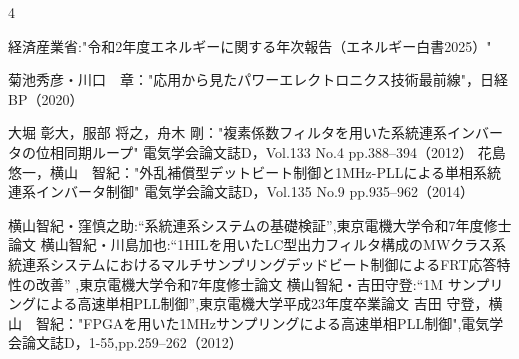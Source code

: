 
\small
\begin{thebibliography}{4} %
 \setlength{\itemsep}{0zh}

   経済産業省:"令和2年度エネルギーに関する年次報告（エネルギー白書2025）"

   菊池秀彦・川口　章："応用から見たパワーエレクトロニクス技術最前線"，日経BP（2020）   

    大堀 彰大，服部 将之，舟木 剛："複素係数フィルタを用いた系統連系インバータの位相同期ループ"
    電気学会論文誌D，Vol.133 No.4 pp.388–394（2012）
    花島　悠一，横山　智紀："外乱補償型デットビート制御と1MHz-PLLによる単相系統連系インバータ制御"
    電気学会論文誌D，Vol.135 No.9 pp.935–962（2014）
   
  
   横山智紀・窪慎之助:“系統連系システムの基礎検証”,東京電機大学令和7年度修士論文
   横山智紀・川島加也:“1HILを用いたLC型出力フィルタ構成のMWクラス系統連系システムにおけるマルチサンプリングデッドビート制御によるFRT応答特性の改善”
   ,東京電機大学令和7年度修士論文
    横山智紀・吉田守登:“1M サンプリングによる高速単相PLL制御”,東京電機大学平成23年度卒業論文
     吉田 守登，横山　智紀："FPGAを用いた1MHzサンプリングによる高速単相PLL制御",電気学会論文誌D，1-55,pp.259–262（2012）
\end{thebibliography}
